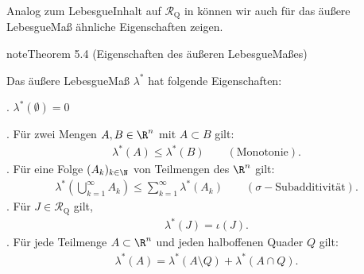 \documentclass[letterpaper,10pt,german]{jupyterBook}
\begin{document}
\sphinxAtStartPar
Analog zum Lebesgue\sphinxhyphen{}Inhalt auf \(\mathcal{R}_\text{Q}\) in {\hyperref[\detokenize{masstheorie/masstheorie:thm:lebesguevolume}]{}} können wir auch für das äußere Lebesgue\sphinxhyphen{}Maß ähnliche Eigenschaften zeigen.
\label{masstheorie/masstheorie:thm:outerlebesgue}
\begin{sphinxadmonition}{note}{Theorem 5.4 (Eigenschaften des äußeren Lebesgue\sphinxhyphen{}Maßes)}



\sphinxAtStartPar
Das äußere Lebesgue\sphinxhyphen{}Maß \(\lambda^*\) hat folgende Eigenschaften:

. \(\lambda^*(\emptyset) = 0\)

. Für zwei Mengen \(A, B \in \R^n\) mit \(A \subset B\) gilt:
\begin{equation*}
\begin{split}\lambda^*(A) \leq \lambda^*(B) \qquad (\text{Monotonie}).\end{split}
\end{equation*}
. Für eine Folge \((A_k)_{k\in\N}\) von Teilmengen des \(\R^n\) gilt:
\begin{equation*}
\begin{split}\lambda^*\left( \bigcup_{k=1}^\infty A_k \right) \leq \sum_{k=1}^\infty \lambda^*(A_k) \qquad (\sigma\!-\!\text{Subadditivität}).\end{split}
\end{equation*}
. Für \(J\in\mathcal{R}_{\text{Q}}\) gilt,
\begin{equation*}
\begin{split}\lambda^*(J) = \iota(J).\end{split}
\end{equation*}
. Für jede Teilmenge \(A \subset \R^n\) und jeden halboffenen Quader \(Q\) gilt:
\begin{equation*}
\begin{split}\lambda^*(A) = \lambda^*(A \setminus Q) + \lambda^*(A \cap Q).\end{split}
\end{equation*}\end{sphinxadmonition}
\end{document}
